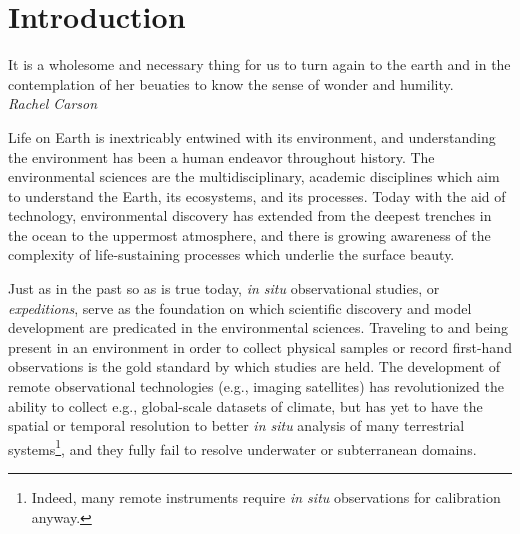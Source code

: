 \chapter{Introduction}

\begin{center}
    \begin{minipage}{0.5\textwidth}
      \begin{small}
       It is a wholesome and necessary thing for us to turn again to the earth and in the contemplation of her beuaties to know the sense of wonder and humility.\\ \emph{Rachel Carson}
      \end{small}
    \end{minipage}
    \vspace{0.5cm}
\end{center}





Life on Earth is inextricably entwined with its environment, and understanding the environment has been a human endeavor throughout history.
The environmental sciences are the multidisciplinary, academic disciplines which aim to understand the Earth, its ecosystems, and its processes.
Today with the aid of technology, environmental discovery has extended from the deepest trenches in the ocean to the uppermost atmosphere, and there is growing awareness of the complexity of life-sustaining processes which underlie the surface beauty. 

Just as in the past so as is true today, \emph{in situ} observational studies, or \emph{expeditions}, serve as the foundation on which scientific discovery and model development are predicated in the environmental sciences.
Traveling to and being present in an environment in order to collect physical samples or record first-hand observations is the gold standard by which studies are held.
The development of remote observational technologies (e.g., imaging satellites) has revolutionized the ability to collect e.g., global-scale datasets of climate, but has yet to have the spatial or temporal resolution to better \emph{in situ} analysis of many terrestrial systems\footnote{Indeed, many remote instruments require \emph{in situ} observations for calibration anyway.}, and they fully fail to resolve underwater or subterranean domains. 

